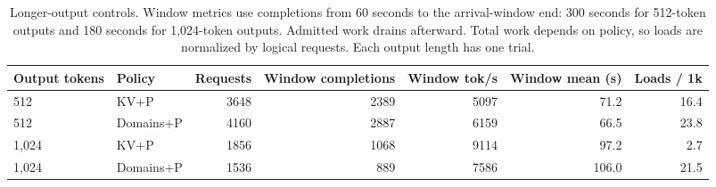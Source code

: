 \begin{table}[t]\centering\small\setlength{\tabcolsep}{4pt}
\begin{tabular}{llrrrrr}\toprule
Output tokens & Policy & Requests & Window completions & Window tok/s & Window mean (s) & Loads / 1k\\\midrule
512 & KV+P & 3648 & 2389 & 5097 & 71.2 & 16.4 \\
512 & Domains+P & 4160 & 2887 & 6159 & 66.5 & 23.8 \\
1,024 & KV+P & 1856 & 1068 & 9114 & 97.2 & 2.7 \\
1,024 & Domains+P & 1536 & 889 & 7586 & 106.0 & 21.5 \\
\bottomrule\end{tabular}
\caption{Longer-output controls. Window metrics use completions from 60 seconds to the arrival-window end: 300 seconds for 512-token outputs and 180 seconds for 1,024-token outputs. Admitted work drains afterward. Total work depends on policy, so loads are normalized by logical requests. Each output length has one trial.}\label{tab:long}
\end{table}
